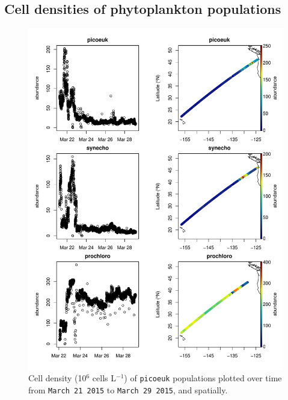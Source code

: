 \documentclass[a4paper]{article}
\begin{document}
\newpage
\subsection{Cell densities of phytoplankton populations}

\begin{figure}[H]
\centering
\includegraphics{CruiseReport-003}
\caption{Cell density (10$^{6}$ cells L$^{-1}$) of \texttt{picoeuk} populations plotted over time from \texttt{March 21 2015} to \texttt{March 29 2015}, and spatially.}
\end{figure}


\newpage
\end{document}
